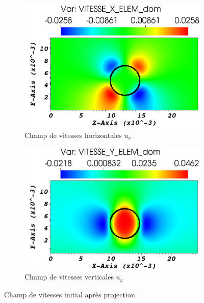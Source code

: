 \begin{figure}[H] 
	\centering
	\begin{subfigure}[H]{0.47\textwidth}
		\centering
		\includegraphics[width=\textwidth]{figure/Champ_vitesse_initX.png}
		\caption{Champ de vitesses horizontales $u_x$}
		
	\end{subfigure} 
	\begin{subfigure}[H]{0.47\textwidth}
		\centering
		\includegraphics[width=\textwidth]{figure/Champ_vitesse_initY.png}
		\caption{Champ de vitesses verticales $u_y$}
	\end{subfigure}
	\caption{Champ de vitesses initial après projection}
	\label{fig:champvitesse_init}
\end{figure}
